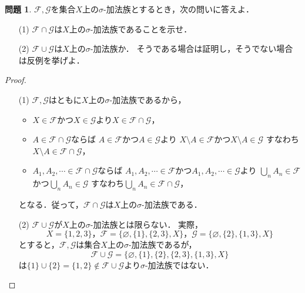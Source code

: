 \documentclass{jsarticle}
\theoremstyle{definition}
\newtheorem{qst}{問題}
\begin{document}
\begin{qst}
$\mathcal{F},\mathcal{G}$を集合$X$上の$\sigma$-加法族とするとき，次の問いに答えよ．
\begin{itemize}
\item[(1)]$\mathcal{F}\cap\mathcal{G}$は$X$上の$\sigma$-加法族であることを示せ．
\item[(2)]$\mathcal{F}\cup\mathcal{G}$は$X$上の$\sigma$-加法族か．
そうである場合は証明し，そうでない場合は反例を挙げよ．
\end{itemize}
\end{qst}
\begin{proof}
\begin{itemize}
\item[(1)]
$\mathcal{F},\mathcal{G}$はともに$X$上の$\sigma$-加法族であるから，
\begin{itemize}
\item$X\in\mathcal{F}$かつ$X\in\mathcal{G}$より$X\in\mathcal{F}\cap\mathcal{G}$，
\item$A\in\mathcal{F}\cap\mathcal{G}$ならば
$A\in\mathcal{F}$かつ$A\in\mathcal{G}$より
$X\setminus A\in\mathcal{F}$かつ$X\setminus A\in\mathcal{G}$
すなわち$X\setminus A\in\mathcal{F}\cap\mathcal{G}$，
\item$A_1,A_2,\cdots\in\mathcal{F}\cap\mathcal{G}$ならば
$A_1,A_2,\cdots\in\mathcal{F}$かつ$A_1,A_2,\cdots\in\mathcal{G}$より
$\bigcup_nA_n\in\mathcal{F}$かつ$\bigcup_nA_n\in\mathcal{G}$
すなわち$\bigcup_nA_n\in\mathcal{F}\cap\mathcal{G}$，
\end{itemize}
となる．従って，$\mathcal{F}\cap\mathcal{G}$は$X$上の$\sigma$-加法族である．
\item[(2)]
$\mathcal{F}\cup\mathcal{G}$が$X$上の$\sigma$-加法族とは限らない．
実際，
\[
X=\{1,2,3\}，
\mathcal{F}=\{\varnothing,\{1\},\{2,3\},X\}，
\mathcal{G}=\{\varnothing,\{2\},\{1,3\},X\}
\]
とすると，$\mathcal{F},\mathcal{G}$は集合$X$上の$\sigma$-加法族であるが，
\[
\mathcal{F}\cup\mathcal{G}=\{\varnothing,\{1\},\{2\},\{2,3\},\{1,3\},X\}
\]
は$\{1\}\cup\{2\}=\{1,2\}\notin\mathcal{F}\cup\mathcal{G}$より$\sigma$-加法族ではない．
\end{itemize}
\end{proof}
\end{document}
